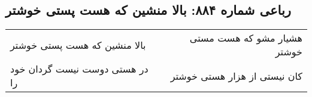 \begin{center}
\section*{رباعی شماره ۸۸۴: بالا منشین که هست پستی خوشتر}
\label{sec:0884}
\begin{longtable}{l p{0.5cm} r}
بالا منشین که هست پستی خوشتر
&&
هشیار مشو که هست مستی خوشتر
\\
در هستی دوست نیست گردان خود را
&&
کان نیستی از هزار هستی خوشتر
\\
\end{longtable}
\end{center}
